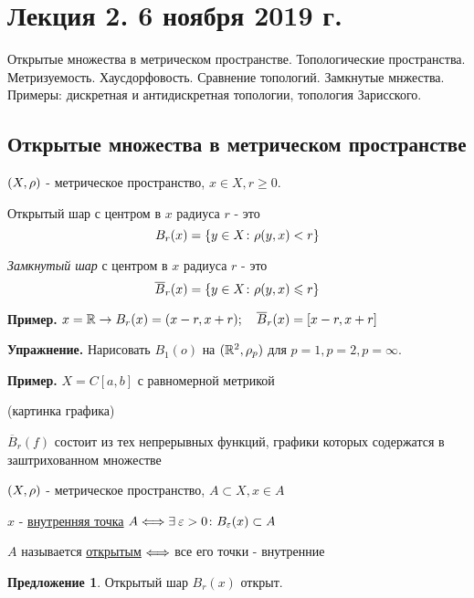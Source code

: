 \documentclass[../../main.tex]{subfiles}
\begin{document}
\section{Лекция 2. 6 ноября 2019 г.}
\vspace{10pt}

{\large Открытые множества в метрическом пространстве. Топологические пространства. Метризуемость. Хаусдорфовость. Сравнение топологий. Замкнутые мнжества. Примеры: дискретная и антидискретная топологии, топология Зарисского.}

\vspace{10pt}

\subsection{Открытые множества в метрическом пространстве}

$(X, \rho)$ - метрическое пространство, $x \in X, r \geq 0$.

 Открытый шар с центром в $x$ радиуса $r$ - это 
$$B_r(x) = \left\{ y \in X \colon \rho(y, x) < r \right\}$$

\textit{Замкнутый шар} с центром в $x$ радиуса $r$ - это
$$\overline{B}_r(x) = \left\{ y\in X \colon \rho(y, x) \leqslant r \right\}$$

\textbf{Пример. } \quad $x = \mathbb{R} \rightarrow B_r(x) = (x - r, x + r); \quad \overline{B}_r(x) = [x - r, x+r] $

\textbf{Упражнение.} Нарисовать $B_1(o)$ на $(\mathbb{R}^2, \rho_p)$ для $p = 1, p = 2, p = \infty$.

\textbf{Пример. } $X = C[a,b]$ с равномерной метрикой


\begin{minipage}{0.4\linewidth}
(картинка графика)
\end{minipage}
\begin{minipage}{0.6\linewidth}
$\overline{B}_r(f)$ состоит из тех непрерывных функций, графики которых содержатся в заштрихованном множестве
\end{minipage}
\vspace{10pt}

 $(X, \rho)$ - метрическое пространство, $A \subset X, x \in A$

$x$ - \underline{внутренняя точка} $A \Longleftrightarrow \exists\: \varepsilon > 0 \colon B_{\varepsilon}(x) \subset A$ 

$A$ называется \underline{открытым} $\Longleftrightarrow$ все его точки - внутренние

\textbf{Предложение 1}. Открытый шар $B_r(x)$ открыт.
\end{document}
